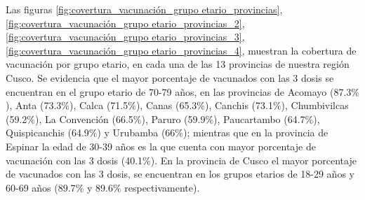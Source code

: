 \documentclass[12pt,a4paper,openany]{book}
\begin{document}
	
	Las figuras \ref{fig:covertura_vacunación_grupo etario_provincias}, \ref{fig:covertura_vacunación_grupo etario_provincias_2}, \ref{fig:covertura_vacunación_grupo etario_provincias_3}, \ref{fig:covertura_vacunación_grupo etario_provincias_4},
	muestran la cobertura de vacunación por grupo etario, en cada una de las 13 provincias de nuestra región Cusco. Se evidencia que el mayor porcentaje de vacunados con las 3 dosis se encuentran en el grupo etario de 70-79 años, en las provincias de Acomayo (87.3$\%$), Anta (73.3$\%$), Calca (71.5$\%$), Canas (65.3$\%$), Canchis (73.1$\%$), Chumbivilcas (59.2$\%$), La Convención (66.5$\%$), Paruro (59.9$\%$), Paucartambo (64.7$\%$), Quispicanchis (64.9$\%$) y Urubamba (66$\%$); mientras que en la provincia de Espinar la edad de 30-39 años es la que cuenta con mayor porcentaje de vacunación con las 3 dosis (40.1$\%$). En la provincia de Cusco el mayor porcentaje de vacunados con las 3 dosis, se encuentran en los grupos etarios de 18-29 años y 60-69 años (89.7$\%$ y 89.6$\%$ respectivamente).
	
\end{document}
